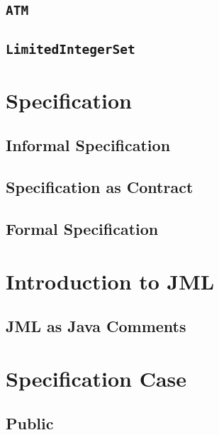\documentclass[a4paper, 11pt, accentcolor = tud3b]{tudreport}
\begin{document}
			\subsection{\texttt{ATM}} %

			\subsection{\texttt{LimitedIntegerSet}} %

		\section{Specification} %

			\subsection{Informal Specification} %

			\subsection{Specification as Contract} %

			\subsection{Formal Specification} %

		\section{Introduction to JML} %

			\subsection{JML as Java Comments} %

		\section{Specification Case} %

			\subsection{Public} %
\end{document}
